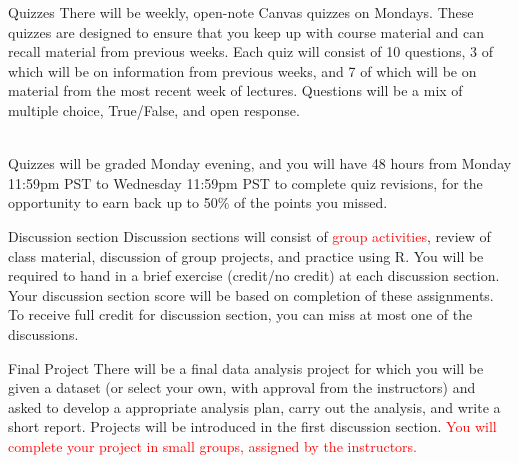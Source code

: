 \documentclass{beamer}
\begin{document}
\begin{frame}{Quizzes}
There will be weekly, open-note Canvas quizzes on Mondays. These quizzes are designed to ensure that you keep up with course material and can recall material from previous weeks. Each quiz will consist of 10 questions, 3 of which will be on information from previous weeks, and 7 of which will be on material from the most recent week of lectures. Questions will be a mix of multiple choice, True/False, and open response. \\~\

Quizzes will be graded Monday evening, and you will have 48 hours from Monday 11:59pm PST to Wednesday 11:59pm PST to complete quiz revisions, for the opportunity to earn back up to 50\% of the points you missed.
\end{frame}


\begin{frame}{Discussion section}
Discussion sections will consist of \textcolor{red}{group activities}, review of class material, discussion of group projects, and practice using R. You will be required to hand in a brief exercise (credit/no credit) at each discussion section. Your discussion section score will be based on completion of these assignments. To receive full credit for discussion section, you can miss at most one of the discussions.
\end{frame}

\begin{frame}{Final Project}
There will be a final data analysis project for which you will be given a dataset (or select your own, with approval from the instructors) and asked to develop a appropriate analysis plan, carry out the analysis, and write a short report. Projects will be introduced in the first discussion section. \textcolor{red}{You will complete your project in small groups, assigned by the instructors.}
\end{frame}
\end{document}
